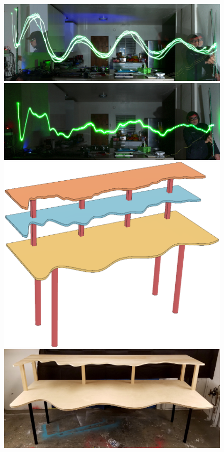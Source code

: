 \begin{figure}
  \includegraphics[width=\linewidth]{threefundamentals_and_me_dccq.jpg}
  \includegraphics[width=\linewidth]{wave87_and_me90_dccq.jpg}
  \includegraphics[width=\linewidth]{WaveTableFusion360.png}
  \includegraphics[width=\linewidth]{wavetable_20161129_214045cq.jpg}

\end{figure}
